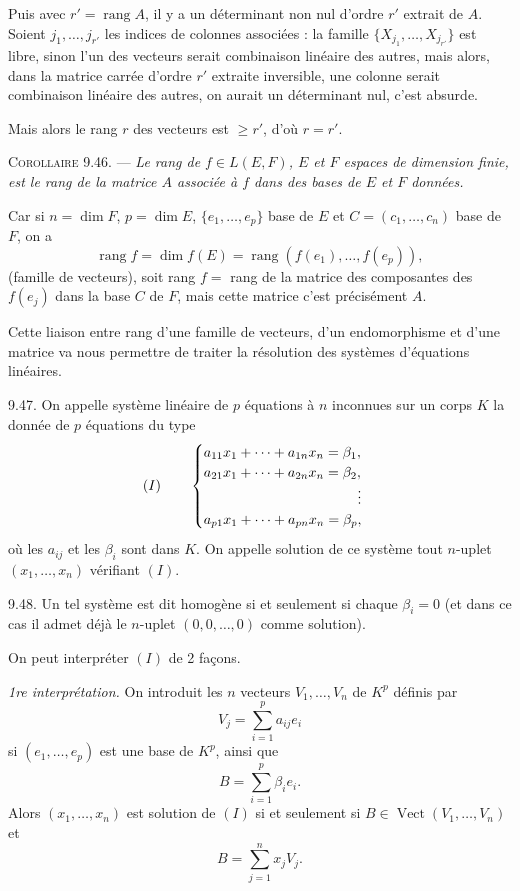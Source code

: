 Puis avec $r'=\operatorname{rang}A$, il y a un déterminant non nul d'ordre $r'$ extrait de $A$. Soient $j_1,\ldots,j_{r'}$ les indices de colonnes associées : la famille $\{X_{j_1},\ldots,X_{j_{r'}}\}$ est libre, sinon l'un des vecteurs serait combinaison linéaire des autres, mais alors, dans la matrice carrée d'ordre $r'$ extraite inversible, une colonne serait combinaison linéaire des autres, on aurait un déterminant nul, c'est absurde.

Mais alors le rang $r$ des vecteurs est $\ge r'$, d'où $r=r'$. \bookend

\medskip\noindent\textsc{Corollaire 9.46.} --- \emph{Le rang de $f\in L(E,F)$, $E$ et $F$ espaces de dimension finie, est le rang de la matrice $A$ associée à $f$ dans des bases de $E$ et $F$ données.}

Car si $n=\dim F$, $p=\dim E$, $\{e_1,\ldots,e_p\}$ base de $E$ et $C=(c_1,\ldots,c_n)$ base de $F$, on a
\[
\operatorname{rang}f=\dim f(E)=\operatorname{rang}(f(e_1),\ldots,f(e_p)),
\]
(famille de vecteurs), soit rang $f=$ rang de la matrice des composantes des $f(e_j)$ dans la base $C$ de $F$, mais cette matrice c'est précisément $A$. \bookend

Cette liaison entre rang d'une famille de vecteurs, d'un endomorphisme et d'une matrice va nous permettre de traiter la résolution des systèmes d'équations linéaires.

\medskip\noindent\textsc{9.47.} On appelle système linéaire de $p$ équations à $n$ inconnues sur un corps $K$ la donnée de $p$ équations du type
\[
(I)\qquad
\begin{cases}
a_{11}x_1+\cdots+a_{1n}x_n=\beta_1,\\
a_{21}x_1+\cdots+a_{2n}x_n=\beta_2,\\
\hfill\vdots\\
a_{p1}x_1+\cdots+a_{pn}x_n=\beta_p,
\end{cases}
\]
où les $a_{ij}$ et les $\beta_i$ sont dans $K$. On appelle solution de ce système tout $n$-uplet $(x_1,\ldots,x_n)$ vérifiant $(I)$.

\medskip\noindent\textsc{9.48.} Un tel système est dit homogène si et seulement si chaque $\beta_i=0$ (et dans ce cas il admet déjà le $n$-uplet $(0,0,\ldots,0)$ comme solution).

On peut interpréter $(I)$ de 2 façons.

\emph{1re interprétation.} On introduit les $n$ vecteurs $V_1,\ldots,V_n$ de $K^p$ définis par
\[
V_j=\sum_{i=1}^p a_{ij}e_i
\]
si $(e_1,\ldots,e_p)$ est une base de $K^p$, ainsi que
\[
B=\sum_{i=1}^p\beta_i e_i.
\]
Alors $(x_1,\ldots,x_n)$ est solution de $(I)$ si et seulement si $B\in\operatorname{Vect}(V_1,\ldots,V_n)$ et
\[
B=\sum_{j=1}^n x_jV_j.
\]


